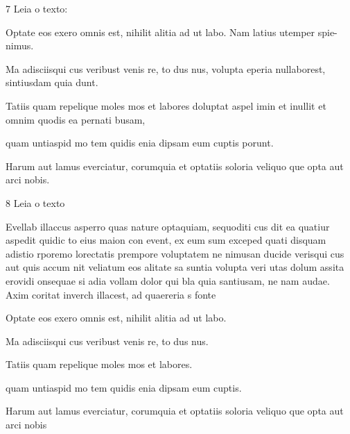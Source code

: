 \linhas

\num{7} Leia o texto:

\lipsum[1]

Optate eos exero omnis est, nihilit alitia ad ut labo. Nam latius utemper spie-
nimus.

\begin{escolha}
\item Ma adisciisqui cus veribust venis re, to dus nus, volupta eperia nullaborest,
sintiusdam quia dunt.
\item Tatiis quam repelique moles mos et labores doluptat aspel imin et inullit et
omnim quodis ea pernati busam,
\item quam untiaspid mo tem quidis enia dipsam eum cuptis porunt.
\item Harum aut lamus everciatur, corumquia et optatiis soloria veliquo que opta
aut arci nobis.
\end{escolha}

\num{8} Leia o texto

Evellab illaccus asperro quas nature optaquiam, sequoditi cus dit ea quatiur
aspedit quidic to eius maion con event, ex eum sum exceped quati disquam
adistio rporemo lorectatis prempore voluptatem ne nimusan ducide verisqui
cus aut quis accum nit veliatum eos alitate sa suntia volupta veri utas dolum
assita erovidi onsequae si adia vollam dolor qui bla quia santiusam, ne nam
audae. Axim coritat inverch illacest, ad quaereria s
fonte

Optate eos exero omnis est, nihilit alitia ad ut labo.

\begin{escolha}
\item Ma adisciisqui cus veribust venis re, to dus nus.
\item Tatiis quam repelique moles mos et labores.
\item quam untiaspid mo tem quidis enia dipsam eum cuptis.
\item Harum aut lamus everciatur, corumquia et optatiis soloria veliquo que opta
aut arci nobis
\end{escolha}

\lipsum[1-20]